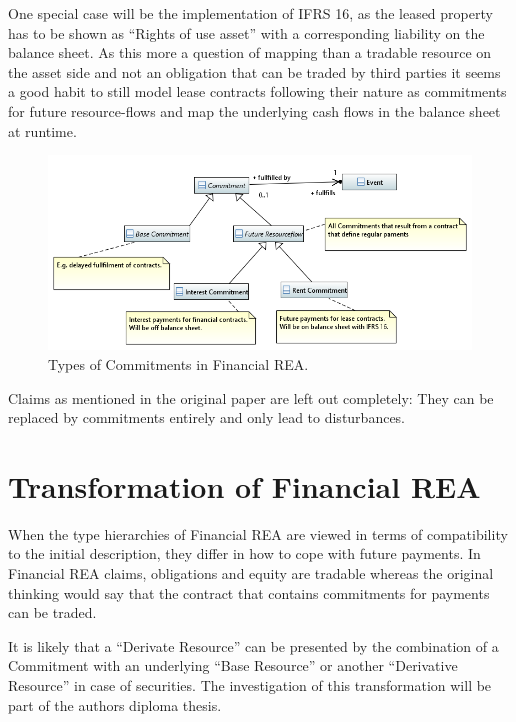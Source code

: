\documentclass[10pt,paper=a4,parskip]{scrartcl}
\newif\ifforme
\newcommand{\note}[1]{\unskip\ignorespaces\ifforme\textbf{#1}\else{}\fi}
\begin{document}
One special case will be the implementation of IFRS 16, as the leased property has to be shown as ``Rights of use asset'' with a corresponding liability  on the balance sheet.
As this more a question of mapping than a tradable resource on the asset side and not an obligation that can be traded by third parties it seems a good habit to still model lease contracts following their nature as commitments for future resource-flows and map the underlying cash flows in the balance sheet at runtime.
\note{https://bankinghub.de/banking/steuerung/ifrs-16-lease-leasing-geschaeftsmodell-off-balance-leasingnehmer}

\begin{figure}
\centering
\includegraphics[width=0.8\linewidth]{"Financial REA EventsCommitments"}
\caption{Types of Commitments in Financial REA.}
\label{fig:financial-rea-eventscommitments}
\end{figure}


Claims as mentioned in the original paper are left out completely: They can be replaced by commitments entirely and only lead to disturbances.

\section{Transformation of Financial REA}

When the type hierarchies of Financial REA are viewed in terms of compatibility to the initial description, they differ in how to cope with future payments.
In Financial REA claims, obligations and equity are tradable whereas the original thinking would say that the contract that contains commitments for payments can be traded.

It is likely that a ``Derivate Resource'' can be presented by the combination of a Commitment with an underlying ``Base Resource'' or another ``Derivative Resource'' in case of securities.
The investigation of this transformation will be part of the authors diploma thesis.



\end{document}
